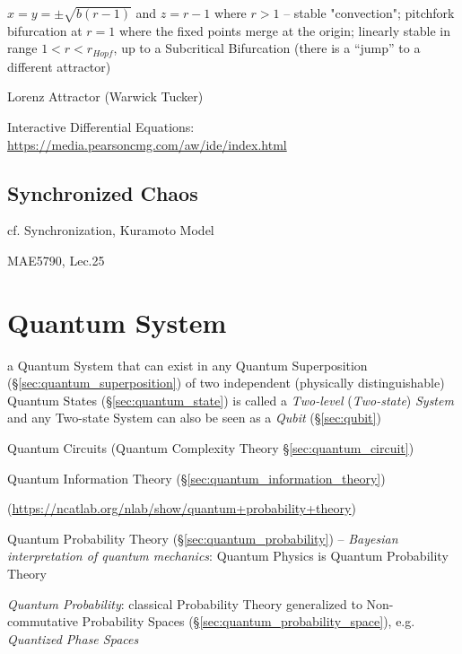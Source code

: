 $x = y = \pm\sqrt{b(r-1)}$ and $z = r-1$ where $r > 1$ -- stable "convection";
pitchfork bifurcation at $r=1$ where the fixed points merge at the origin;
linearly stable in range $1 < r < r_{Hopf}$, up to a Subcritical Bifurcation
(there is a ``jump'' to a different attractor)

Lorenz Attractor (Warwick Tucker)

Interactive Differential Equations:
\url{https://media.pearsoncmg.com/aw/ide/index.html}



\subsection{Synchronized Chaos}\label{sec:synchronized_chaos}

cf. Synchronization, Kuramoto Model

MAE5790, Lec.25



\section{Quantum System}\label{sec:quantum_system}


a Quantum System that can exist in any Quantum Superposition
(\S\ref{sec:quantum_superposition}) of two independent (physically
distinguishable) Quantum States (\S\ref{sec:quantum_state}) is called a
\emph{Two-level} (\emph{Two-state}) \emph{System} and any Two-state System can
also be seen as a \emph{Qubit} (\S\ref{sec:qubit})

Quantum Circuits (Quantum Complexity Theory \S\ref{sec:quantum_circuit})

Quantum Information Theory (\S\ref{sec:quantum_information_theory})

(\url{https://ncatlab.org/nlab/show/quantum+probability+theory})

Quantum Probability Theory (\S\ref{sec:quantum_probability}) -- \emph{Bayesian
  interpretation of quantum mechanics}: Quantum Physics is Quantum Probability
Theory

\emph{Quantum Probability}: classical Probability Theory generalized to
Non-commutative Probability Spaces (\S\ref{sec:quantum_probability_space}), e.g.
\emph{Quantized Phase Spaces}

